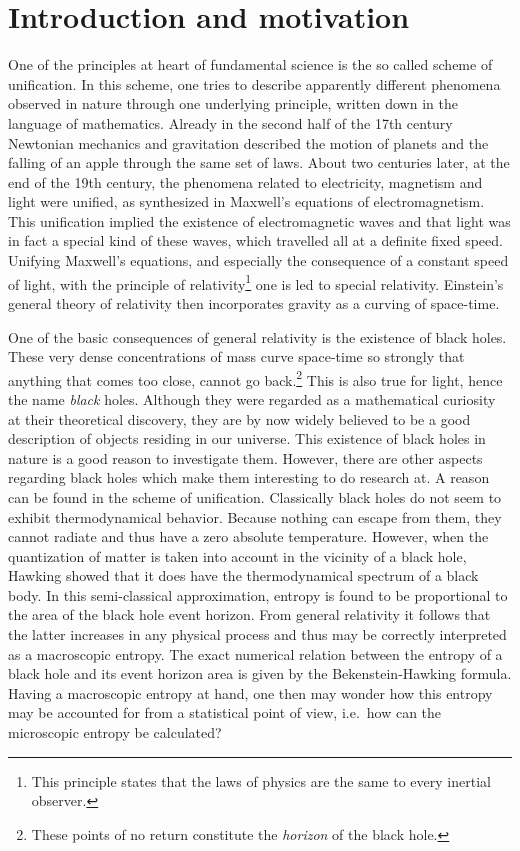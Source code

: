 \documentclass[12pt,twoside]{book}
\begin{document}
\chapter{Introduction and motivation}
\label{ch:intro&motiv}

One of the principles at heart of fundamental science is the so called scheme of unification. In this scheme, one tries to describe apparently different phenomena observed in nature through one underlying principle, written down in the language of mathematics. Already in the second half of the 17th century Newtonian mechanics and gravitation described the motion of planets and the falling of an apple through the same set of laws. About two centuries later, at the end of the 19th century, the phenomena related to electricity, magnetism and light were unified, as synthesized in Maxwell's equations of electromagnetism. This unification implied the existence of electromagnetic waves and that light was in fact a special kind of these waves, which travelled all at a definite fixed speed. Unifying Maxwell's equations, and especially the consequence of a constant speed of light, with the principle of relativity\footnote{This principle states that the laws of physics are the same to every inertial observer.} one is led to special relativity. Einstein's general theory of relativity then incorporates gravity as a curving of space-time.

One of the basic consequences of general relativity is the existence of black holes. These very dense concentrations of mass curve space-time so strongly that anything that comes too close, cannot go back.\footnote{These points of no return constitute the \emph{horizon} of the black hole.} This is also true for light, hence the name \emph{black} holes. Although they were regarded as a mathematical curiosity at their theoretical discovery, they are by now widely believed to be a good description of objects residing in our universe. This existence of black holes in nature is a good reason to investigate them. However, there are other aspects regarding black holes which make them interesting to do research at. A reason can be found in the scheme of unification. Classically black holes do not seem to exhibit thermodynamical behavior. Because nothing can escape from them, they cannot radiate and thus have a zero absolute temperature. However, when the quantization of matter is taken into account in the vicinity of a black hole, Hawking showed that it does have the thermodynamical spectrum of a black body. 
In this semi-classical approximation, entropy is found to be proportional to the area of the black hole event horizon. From general relativity it follows that the latter increases in any physical process and thus may be correctly interpreted as a macroscopic entropy. The exact numerical relation between the entropy of a black hole and its event horizon area is given by the Bekenstein-Hawking formula. Having a macroscopic entropy at hand, one then may wonder how this entropy may be accounted for from a statistical point of view, i.e.\ how can the microscopic entropy be calculated?
\end{document}
